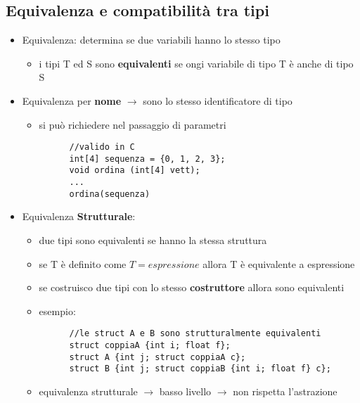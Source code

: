 \documentclass{article}
\begin{document}
\begin{flushleft}
\smallskip

\section*{Equivalenza e compatibilità tra tipi}
\begin{itemize}
  \item Equivalenza: determina se due variabili hanno lo stesso tipo
  \begin{itemize}
    \item i tipi T ed S sono \textbf{equivalenti} se ongi variabile di tipo T è anche di tipo S
  \end{itemize}
  \item Equivalenza per \textbf{nome} $\rightarrow$ sono lo stesso identificatore di tipo
  \begin{itemize}
    \item si può richiedere nel passaggio di parametri
    \begin{lstlisting}
      //valido in C
      int[4] sequenza = {0, 1, 2, 3};
      void ordina (int[4] vett);
      ...
      ordina(sequenza)
    \end{lstlisting}
  \end{itemize}
\end{itemize}

\newpage

\begin{itemize}
  \item Equivalenza \textbf{Strutturale}:
  \begin{itemize}
    \item due tipi sono equivalenti se hanno la stessa struttura
    \item se T è definito come $T = espressione$ allora T è equivalente a espressione
    \item se costruisco due tipi con lo stesso \textbf{costruttore} allora sono equivalenti
    \item esempio:
    \begin{lstlisting}
      //le struct A e B sono strutturalmente equivalenti
      struct coppiaA {int i; float f};
      struct A {int j; struct coppiaA c};
      struct B {int j; struct coppiaB {int i; float f} c};
    \end{lstlisting} 
    \item equivalenza strutturale $\rightarrow$ basso livello $\rightarrow$ non rispetta l'astrazione
  \end{itemize}
\end{itemize}


\end{flushleft}
\end{document}
